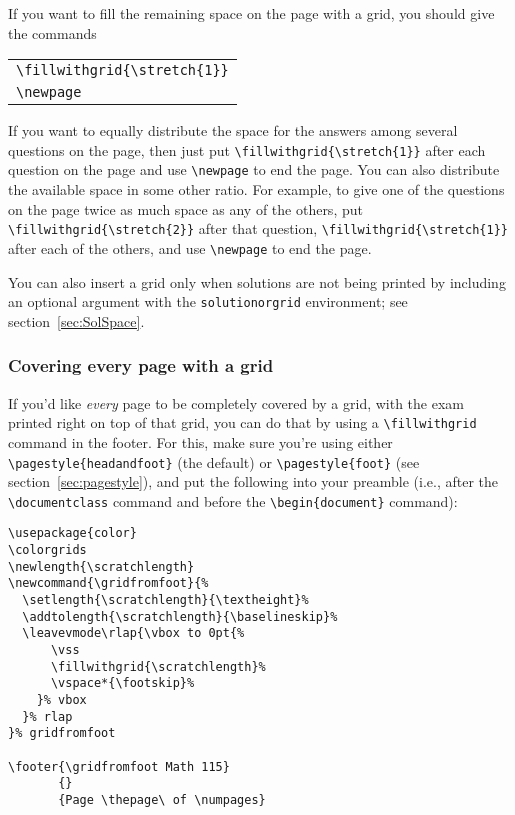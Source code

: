 \documentclass[12pt]{exam}
\makeatletter
\newcommand{\indc}[1]{\index{#1@\texttt{\char`\\#1}}}
\makeatother
\begin{document}
If you want to fill the remaining space on the page with a grid, you
should give the commands\indc{stretch}
\begin{center}
  \begin{tabular}{l}
    \verb"\fillwithgrid{\stretch{1}}"\\
    \verb"\newpage"
  \end{tabular}
\end{center}
If you want to equally distribute the space for the answers among
several questions on the page, then just put
\verb"\fillwithgrid{\stretch{1}}" after each
question on the page and use \verb"\newpage" to end the page.  You can
also distribute the available space in some other ratio.  For example,
to give one of the questions on the page twice as much space as any of
the others, put \verb"\fillwithgrid{\stretch{2}}" after that question,
\verb"\fillwithgrid{\stretch{1}}" after each of the others, and use
\verb"\newpage" to end the page.

You can also insert a grid only when solutions are not being
printed by including an optional argument with the
\verb"solutionorgrid" environment; see
section~\ref{sec:SolSpace}.

\subsubsection{Covering every page with a grid}
\label{sec:CoverWGrid}

If you'd like \emph{every} page to be completely covered by a grid,
with the exam printed right on top of that grid, you can do that by
using a \verb"\fillwithgrid" command in the footer.  For this, make
sure you're using either \verb"\pagestyle{headandfoot}" (the default)
or \verb"\pagestyle{foot}" (see section~\ref{sec:pagestyle}), and put
the following into your preamble (i.e., after the
\verb"\documentclass" command and before the \verb"\begin{document}"
  command):\indc{gridfromfoot}
\begin{verbatim}
\usepackage{color}
\colorgrids
\newlength{\scratchlength}
\newcommand{\gridfromfoot}{%
  \setlength{\scratchlength}{\textheight}%
  \addtolength{\scratchlength}{\baselineskip}%
  \leavevmode\rlap{\vbox to 0pt{%
      \vss
      \fillwithgrid{\scratchlength}%
      \vspace*{\footskip}%
    }% vbox
  }% rlap
}% gridfromfoot

\footer{\gridfromfoot Math 115}
       {}
       {Page \thepage\ of \numpages}
\end{verbatim}
\end{document}
